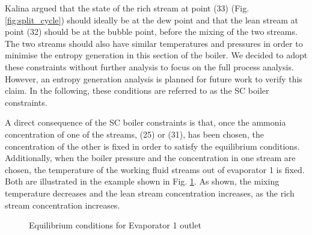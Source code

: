 \documentclass[final,times,5p]{elsarticle}
\begin{document}
Kalina argued \cite{Kalina1986a} that the state of the rich stream at point (33) (Fig. \ref{fig:split_cycle}) should ideally be at the dew point and that the lean stream at point (32) should be at the bubble point, before the mixing of the two streams. The two streams should also have similar temperatures and pressures in order to minimise the entropy generation in this section of the boiler. We decided to adopt these constraints without further analysis to focus on the full process analysis. However, an entropy generation analysis is planned for future work to verify this claim. In the following, these conditions are referred to as the SC boiler constraints. 

A direct consequence of the SC boiler constraints is that, once the ammonia concentration of one of the streams, (25) or (31), has been chosen, the concentration of the other is fixed in order to satisfy the equilibrium conditions. Additionally, when the boiler pressure and the concentration in one stream are chosen, the temperature of the working fluid streams out of evaporator 1 is fixed. Both are illustrated in the example shown in Fig. \ref{fig:bubbleDew}. As shown, the mixing temperature decreases and the lean stream concentration increases, as the rich stream concentration increases. 



\begin{figure}[htpb]
\centering
{}

\caption{Equilibrium conditions for Evaporator 1 outlet}
\label{fig:bubbleDew}
\end{figure}
\end{document}
